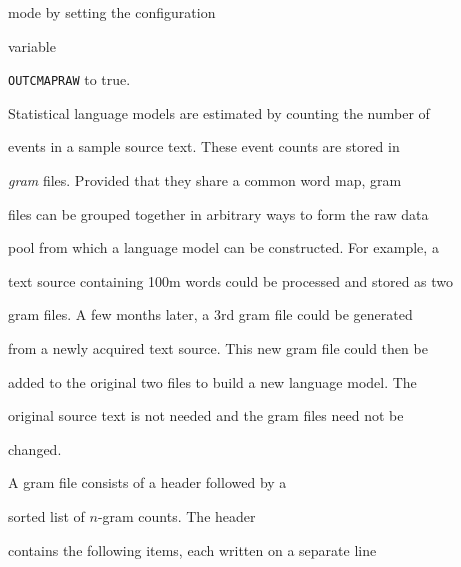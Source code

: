 mode  by setting the configuration


variable


\texttt{OUTCMAPRAW} to true.










Statistical language models are estimated by counting the number of


events in a sample source text.  These event counts are stored in


\textit{gram} files.  Provided that they share a common word map, gram


files can be grouped together in arbitrary ways to form the raw data


pool from which a language model can be constructed.  For example, a


text source containing 100m words could be processed and stored as two


gram files. A few months later, a 3rd gram file could be generated


from a newly acquired text source.  This new gram file could then be


added to the original two files to build a new language model.  The


original source text is not needed and the gram files need not be


changed. 





A gram file consists of a header followed by a


sorted list of $n$-gram counts. The header


contains the following items, each written on a separate line


